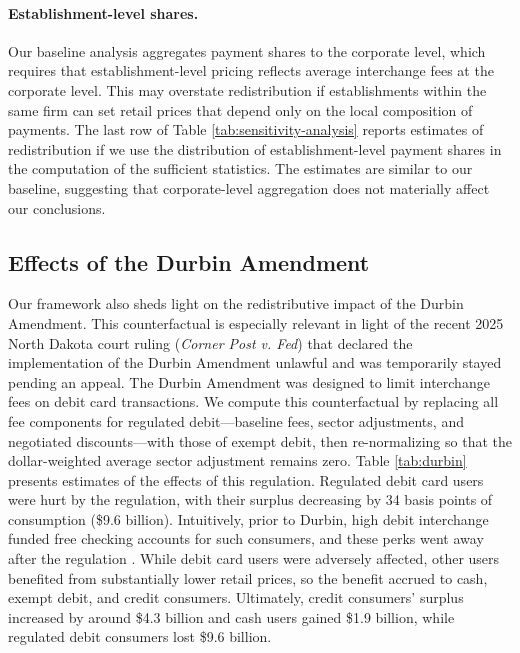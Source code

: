 \documentclass[11pt,english]{article}
\theoremstyle{remark}
\begin{document}
\paragraph{Establishment-level shares.}
Our baseline analysis aggregates payment shares to the corporate level, which requires that establishment-level pricing reflects average interchange fees at the corporate level. 
This may overstate redistribution if establishments within the same firm can set retail prices that depend only on the local composition of payments.
The last row of Table \ref{tab:sensitivity-analysis} reports estimates of redistribution if we use the distribution of establishment-level payment shares in the computation of the sufficient statistics.
The estimates are similar to our baseline, suggesting that corporate-level aggregation does not materially affect our conclusions.

\subsection{Effects of the Durbin Amendment}

Our framework also sheds light on the redistributive impact of the Durbin Amendment.
This counterfactual is especially relevant in light of the recent 2025 North Dakota court ruling (\textit{Corner Post v. Fed}) that declared the implementation of the Durbin Amendment unlawful and was temporarily stayed pending an appeal.
The Durbin Amendment was designed to limit interchange fees on debit card transactions.
We compute this counterfactual by replacing all fee components for regulated debit---baseline fees, sector adjustments, and negotiated discounts---with those of exempt debit, then re-normalizing so that the dollar-weighted average sector adjustment remains zero.
Table \ref{tab:durbin} presents estimates of the effects of this regulation.
Regulated debit card users were hurt by the regulation, with their surplus decreasing by 34 basis points of consumption (\$9.6 billion).
Intuitively, prior to Durbin, high debit interchange funded free checking accounts for such consumers, and these perks went away after the regulation \citep{Mukharlyamov.Sarin2025}.
While debit card users were adversely affected, other users benefited from substantially lower retail prices, so the benefit accrued to cash, exempt debit, and credit consumers.
Ultimately, credit consumers' surplus increased by around \$4.3 billion and cash users gained \$1.9 billion, while regulated debit consumers lost \$9.6 billion.
\end{document}
